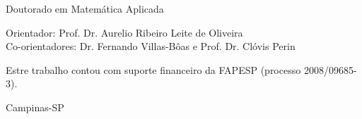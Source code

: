 \begin{titlepage}
\begin{center}
{\sf\normalsize{Doutorado em Matem\'atica Aplicada}}
\end{center}
\vspace{1cm}
\begin{center}
 
{ \sf Orientador: {\large Prof. Dr.  Aurelio Ribeiro Leite de Oliveira}}\\[2mm] 
{ \sf Co-orientadores: {\large Dr. Fernando Villas-Bôas e Prof. Dr. Clóvis
Perin}}
\end{center}  
\vspace{1.5cm}

\begin{center}
{\sf Estre trabalho contou com suporte financeiro da FAPESP (processo
2008/09685-3).
 \vspace{1cm}

Campinas-SP

}
\end{center}

\end{titlepage}
\cleardoublepage

